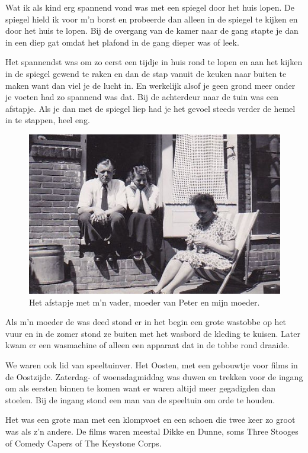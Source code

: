 \documentclass[12pt,twoside, openright]{memoir}
\begin{document}
Wat ik als kind erg spannend vond was met een spiegel door het huis lopen. De spiegel hield ik voor m’n borst en probeerde dan alleen in de spiegel te kijken en door het huis te lopen. Bij de overgang van de kamer naar de gang stapte je dan in een diep gat omdat het plafond in de gang dieper was of leek. 

Het spannendst was om zo eerst een tijdje in huis rond te lopen en aan het kijken in de spiegel gewend te raken en dan de stap vanuit de keuken naar buiten te maken want dan viel je de lucht in. En werkelijk alsof je geen grond meer onder je voeten had zo spannend was dat. Bij de achterdeur naar de tuin was een afstapje. Als je dan met de spiegel liep had je het gevoel steeds verder de hemel in te stappen, heel eng. 

\begin{figure}
\includegraphics[width=\textwidth]{img/ch5/gevonden_0009}
\caption*{\footnotesize Het afstapje met m’n vader, moeder van Peter en mijn moeder.}
\end{figure}

Als m’n moeder de was deed stond er in het begin een grote wastobbe op het vuur en in de zomer stond ze buiten met het wasbord de kleding te kuisen. Later kwam er een wasmachine of alleen een apparaat dat in de tobbe rond draaide. 

We waren ook lid van speeltuinver. Het Oosten, met een gebouwtje voor films in de Oostzijde. Zaterdag- of woensdagmiddag was duwen en trekken voor de ingang om als eersten binnen te komen want er waren altijd meer gegadigden dan stoelen. Bij de ingang stond een man van de speeltuin om orde te houden. 

Het was een grote man met een klompvoet en een schoen die twee keer zo groot was als z’n andere. De films waren meestal Dikke en Dunne, soms Three Stooges of Comedy Capers of The Keystone Corps. 
\end{document}
